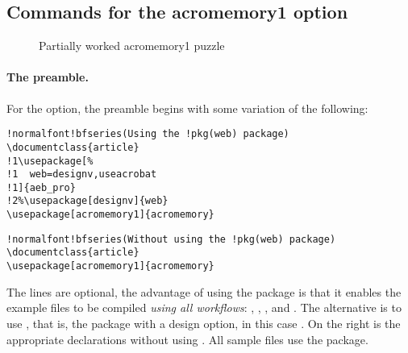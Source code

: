 \documentclass{article}
\begin{document}
\subsection{Commands for the \textsf{acromemory1} option}

\begin{figure}[htb]\centering{}
\caption{Partially worked \textsf{acromemory1} puzzle}\label{fig:am1}
\end{figure}

\paragraph*{The preamble.}
For the  option, the preamble begins with some variation of
the following:
\bVerb\def\1{\llap{\ding{192}\enspace}}\def\2{\llap{\ding{193}\enspace}}
\begin{minipage}[t]{.5\linewidth}
\begin{Verbatim}[fontsize=\small,commandchars=!()]
!normalfont!bfseries(Using the !pkg(web) package)
\documentclass{article}
!1\usepackage[%
!1  web=designv,useacrobat
!1]{aeb_pro}
!2%\usepackage[designv]{web}
\usepackage[acromemory1]{acromemory}
\end{Verbatim}
\end{minipage}\hfill
\begin{minipage}[t]{.5\linewidth}
\begin{Verbatim}[fontsize=\small,commandchars=!()]
!normalfont!bfseries(Without using the !pkg(web) package)
\documentclass{article}
\usepackage[acromemory1]{acromemory}
\end{Verbatim}
\end{minipage}
\eVerb The lines  are optional, the advantage of using the
 package is that it enables the example files to be compiled
\emph{using all workflows}: , , ,
and . The alternative is to use , that
is, the  package with a design option, in this case .
On the right is the appropriate declarations without using . All
sample files use the  package.
\end{document}
